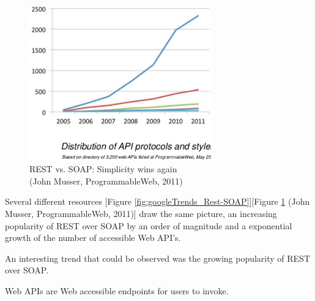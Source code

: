 \begin{figure}[!ht]
	\centering
    \includegraphics[width=0.7\textwidth]{figures/slide-11-1024}
    \caption{REST vs. SOAP: Simplicity wins again\\(John Musser, ProgrammableWeb, 2011)}
    \label{fig:slide-11-1024}

\end{figure}

Several different resources [Figure \ref{fig:googleTrends_Rest-SOAP}][Figure \ref{fig:slide-11-1024} (John Musser, ProgrammableWeb, 2011)] draw the same picture, an increasing popularity of REST over SOAP by an order of magnitude and a exponential growth of the number of accessible Web API's.

An interesting trend that could be observed was the growing popularity of REST over SOAP.~\cite{ploscar2012xml}




Web APIs are Web accessible endpoints for users to invoke.

